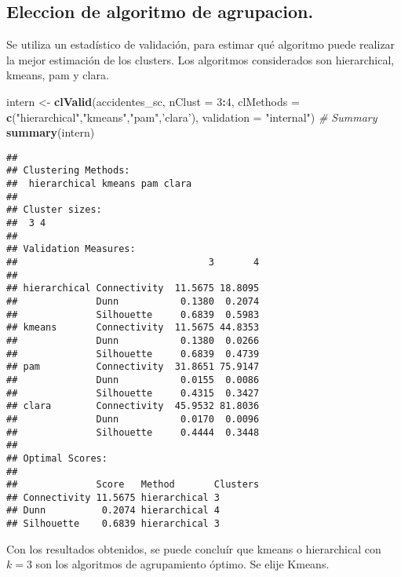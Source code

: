 \documentclass[
]{article}
\newenvironment{Shaded}{\begin{snugshade}}{\end{snugshade}}
\newcommand{\CommentTok}[1]{\textcolor[rgb]{0.56,0.35,0.01}{\textit{#1}}}
\newcommand{\DataTypeTok}[1]{\textcolor[rgb]{0.13,0.29,0.53}{#1}}
\newcommand{\DecValTok}[1]{\textcolor[rgb]{0.00,0.00,0.81}{#1}}
\newcommand{\KeywordTok}[1]{\textcolor[rgb]{0.13,0.29,0.53}{\textbf{#1}}}
\newcommand{\NormalTok}[1]{#1}
\newcommand{\OperatorTok}[1]{\textcolor[rgb]{0.81,0.36,0.00}{\textbf{#1}}}
\newcommand{\StringTok}[1]{\textcolor[rgb]{0.31,0.60,0.02}{#1}}
\begin{document}
\hypertarget{eleccion-de-algoritmo-de-agrupacion.}{%
\subsection{Eleccion de algoritmo de
agrupacion.}\label{eleccion-de-algoritmo-de-agrupacion.}}

Se utiliza un estadístico de validación, para estimar qué algoritmo
puede realizar la mejor estimación de los clusters. Los algoritmos
considerados son hierarchical, kmeans, pam y clara.

\begin{Shaded}
\begin{Highlighting}[]
\NormalTok{intern <-}\StringTok{ }\KeywordTok{clValid}\NormalTok{(accidentes_sc, }\DataTypeTok{nClust =} \DecValTok{3}\OperatorTok{:}\DecValTok{4}\NormalTok{, }
              \DataTypeTok{clMethods =} \KeywordTok{c}\NormalTok{(}\StringTok{"hierarchical"}\NormalTok{,}\StringTok{"kmeans"}\NormalTok{,}\StringTok{"pam"}\NormalTok{,}\StringTok{'clara'}\NormalTok{),}
              \DataTypeTok{validation =} \StringTok{"internal"}\NormalTok{)}
\CommentTok{# Summary}
\KeywordTok{summary}\NormalTok{(intern)}
\end{Highlighting}
\end{Shaded}

\begin{verbatim}
## 
## Clustering Methods:
##  hierarchical kmeans pam clara 
## 
## Cluster sizes:
##  3 4 
## 
## Validation Measures:
##                                  3       4
##                                           
## hierarchical Connectivity  11.5675 18.8095
##              Dunn           0.1380  0.2074
##              Silhouette     0.6839  0.5983
## kmeans       Connectivity  11.5675 44.8353
##              Dunn           0.1380  0.0266
##              Silhouette     0.6839  0.4739
## pam          Connectivity  31.8651 75.9147
##              Dunn           0.0155  0.0086
##              Silhouette     0.4315  0.3427
## clara        Connectivity  45.9532 81.8036
##              Dunn           0.0170  0.0096
##              Silhouette     0.4444  0.3448
## 
## Optimal Scores:
## 
##              Score   Method       Clusters
## Connectivity 11.5675 hierarchical 3       
## Dunn          0.2074 hierarchical 4       
## Silhouette    0.6839 hierarchical 3
\end{verbatim}

Con los resultados obtenidos, se puede concluír que kmeans o
hierarchical con \(k=3\) son los algoritmos de agrupamiento óptimo. Se
elije Kmeans.
\end{document}

